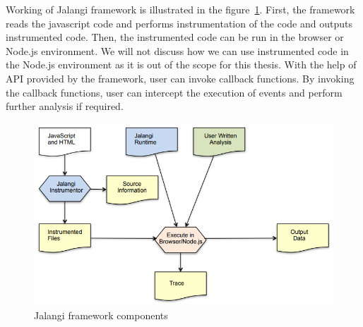 Working of Jalangi framework is illustrated in the figure~\ref{fig:jalangi_components}. First, the framework reads the javascript code and performs instrumentation of the code and outputs instrumented code. Then, the instrumented code can be run in the browser or Node.js environment. We will not discuss how we can use instrumented code in the Node.js environment as it is out of the scope for this thesis. With the help of API provided by the framework, user can invoke callback functions. By invoking the callback functions, user can intercept the execution of events and perform further analysis if required. 

\begin{figure}[!h]
	\centering
	\includegraphics[scale=0.5,trim=0 0 0 0]{images/jalangi_components.png}
	\caption{Jalangi framework components}
	\label{fig:jalangi_components}
\end{figure}


